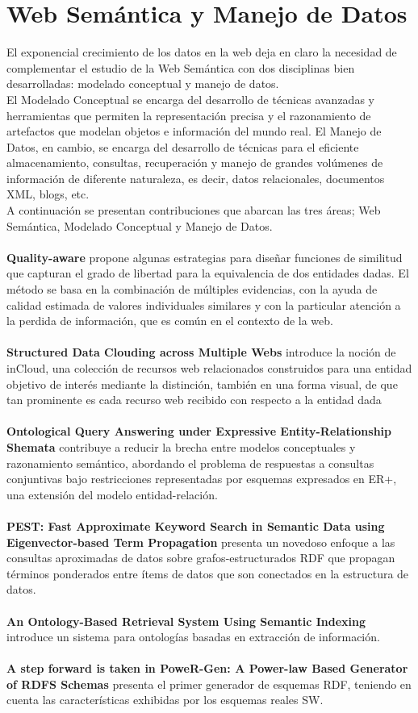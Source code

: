 \documentclass[10pt,a4paper]{article}
\begin{document}
\section{Web Semántica y Manejo de Datos}
El exponencial crecimiento de los datos en la web deja en claro la necesidad de complementar el estudio de la Web Semántica con dos disciplinas bien desarrolladas: modelado conceptual y manejo de datos. 
\\
El Modelado Conceptual se encarga del desarrollo de técnicas avanzadas y herramientas que permiten la representación precisa y el razonamiento de artefactos que modelan objetos e información del mundo real. El Manejo de Datos, en cambio, se encarga del desarrollo de técnicas para el eficiente almacenamiento, consultas, recuperación y manejo de grandes volúmenes de información de diferente naturaleza, es decir, datos relacionales, documentos XML, blogs, etc.
\\
A continuación se presentan contribuciones que abarcan las tres áreas; Web Semántica, Modelado Conceptual y Manejo de Datos.
\\\\
\textbf{Quality-aware} propone algunas estrategias para diseñar funciones de similitud que capturan el grado de libertad para la equivalencia de dos entidades dadas. El método se basa en la combinación de múltiples evidencias, con la ayuda de calidad estimada de valores individuales similares y con la particular atención a la perdida de información, que es común en el contexto de la web. 
\\\\
\textbf{Structured Data Clouding across Multiple Webs} introduce la noción de inCloud, una colección de recursos web relacionados construidos para una entidad objetivo de interés mediante la distinción, también en una forma visual, de que tan prominente es cada recurso web recibido con respecto a la entidad dada
\\\\
\textbf{Ontological Query Answering under Expressive Entity-Relationship Shemata} contribuye a reducir la brecha entre modelos conceptuales y razonamiento semántico, abordando el problema de respuestas a consultas conjuntivas bajo restricciones representadas por esquemas expresados en ER+, una extensión del modelo entidad-relación.
\\\\
\textbf{PEST: Fast Approximate Keyword Search in Semantic Data using Eigenvector-based Term Propagation} presenta un novedoso enfoque a las consultas aproximadas de datos sobre grafos-estructurados RDF que propagan términos ponderados entre ítems de datos que son conectados en la estructura de datos.
\\\\
\textbf{An Ontology-Based Retrieval System Using Semantic Indexing} introduce un sistema para ontologías basadas en extracción de información.
\\\\
\textbf{A step forward is taken in PoweR-Gen: A Power-law Based Generator of RDFS Schemas} presenta el primer generador de esquemas RDF, teniendo en cuenta las características exhibidas por los esquemas reales SW.
\end{document}
